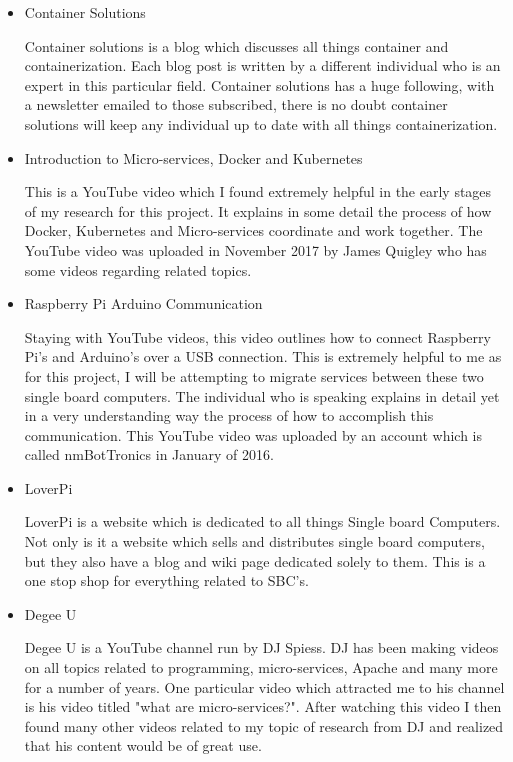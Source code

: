 \begin{itemize}
    \item Container Solutions \cite{Reference10}
    
    Container solutions is a blog which discusses all things container and containerization. Each blog post is written by a different individual who is an expert in this particular field. Container solutions has a huge following, with a newsletter emailed to those subscribed, there is no doubt container solutions will keep any individual up to date with all things containerization.
    
    \item Introduction to Micro-services, Docker and Kubernetes \cite{Reference11}
    
    This is a YouTube video which I found extremely helpful in the early stages of my research for this project. It explains in some detail the process of how Docker, Kubernetes and Micro-services coordinate and work together. The YouTube video was uploaded in November 2017 by James Quigley who has some videos regarding related topics. 
    
    \item Raspberry Pi Arduino Communication \cite{Reference12}
    
    Staying with YouTube videos, this video outlines how to connect Raspberry Pi's and Arduino's over a USB connection. This is extremely helpful to me as for this project, I will be attempting to migrate services between these two single board computers. The individual who is speaking explains in detail yet in a very understanding way the process of how to accomplish this communication. This YouTube video was uploaded by an account which is called nmBotTronics in January of 2016. 
    
    \item LoverPi \cite{Reference13}
    
    LoverPi is a website which is dedicated to all things Single board Computers. Not only is it a website which sells and distributes single board computers, but they also have a blog and wiki page dedicated solely to them. This is a one stop shop for everything related to SBC's.
    
    
    \item Degee U \cite{Reference14}
    
    Degee U is a YouTube channel run by DJ Spiess. DJ has been making videos on all topics related to programming, micro-services, Apache and many more for a number of years. One particular video which attracted me to his channel is his video titled "what are micro-services?". After watching this video I then found many other videos related to my topic of research from DJ and realized that his content would be of great use. 

    
\end{itemize}


